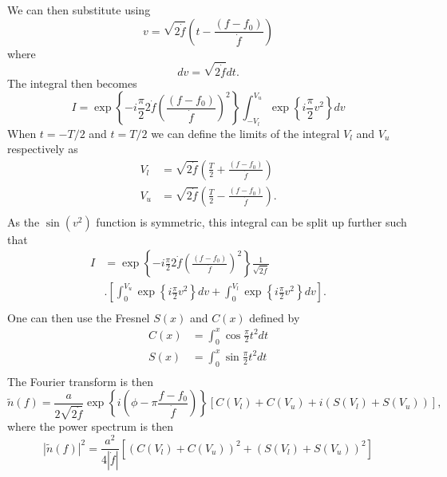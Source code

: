 We can then substitute using
\begin{equation}
v = \sqrt{2\dot{f}}\left( t - \frac{(f-f_0)}{\dot{f}}  \right)
\end{equation}
where
\begin{equation}
dv = \sqrt{2\dot{f}} dt. 
\end{equation}
The integral then becomes
\begin{equation}
I  = \exp{\left\{  - i \frac{\pi}{2} 2 \dot{f} \left(\frac{(f - f_0)}{\dot{f}}\right)^2 \right\}}\int_{-V_l}^{V_u} \exp{\left\{i \frac{\pi}{2} v^2\right\}} dv
\end{equation}
When $t = -T/2$ and $t=T/2$ we can define the limits of the integral $V_l$ and $V_u$ respectively as
\begin{equation}
\begin{split}
V_l &= \sqrt{2\dot{f}}\left( \frac{T}{2} + \frac{(f - f_0)}{\dot{f}}  \right) \\
V_u &= \sqrt{2\dot{f}}\left( \frac{T}{2} - \frac{(f - f_0)}{\dot{f}}  \right). \\
\end{split}
\end{equation}
As the $\sin(v^2)$ function is symmetric, this integral can be split up further such that
\begin{equation}
\begin{split}
I &= \exp{\left\{  - i \frac{\pi}{2} 2 \dot{f} \left(\frac{(f-f_0)}{\dot{f}}\right)^2 \right\}}  \frac{1}{\sqrt{2\dot{f}}}  \\ 
&. \left[\int_{0}^{V_u} \exp{\left\{i \frac{\pi}{2} v^2\right\}} dv\right. + \left. \int_{0}^{V_l} \exp{\left\{i \frac{\pi}{2} v^2\right\}} dv\right].  \\
\end{split}
\end{equation}
One can then use the Fresnel $S(x)$ and $C(x)$ defined by
\begin{equation}
\begin{split}
C(x) &= \int_0^x \cos{\frac{\pi}{2} t^2} dt \\
S(x) &= \int_0^x \sin{\frac{\pi}{2} t^2} dt \\
\end{split}
\end{equation}
The Fourier transform is then
\begin{equation}
\tilde{n}(f) = \frac{a}{2\sqrt{2\dot{f}}} \exp{ \left\{ i(\phi - \pi \frac{f - f_0}{\dot{f}}) \right\} } \left[ C(V_l) + C(V_u) + i(S(V_l) + S(V_u))   \right],
\end{equation}
where the power spectrum is then
\begin{equation}
|\tilde{n}(f)|^2 = \frac{a^2}{4|\dot{f}|}  \left[ (C(V_l) +  C(V_u))^2 + (S(V_l) + S(V_u))^2   \right]
\label{app1:power_fresnel}
\end{equation}

